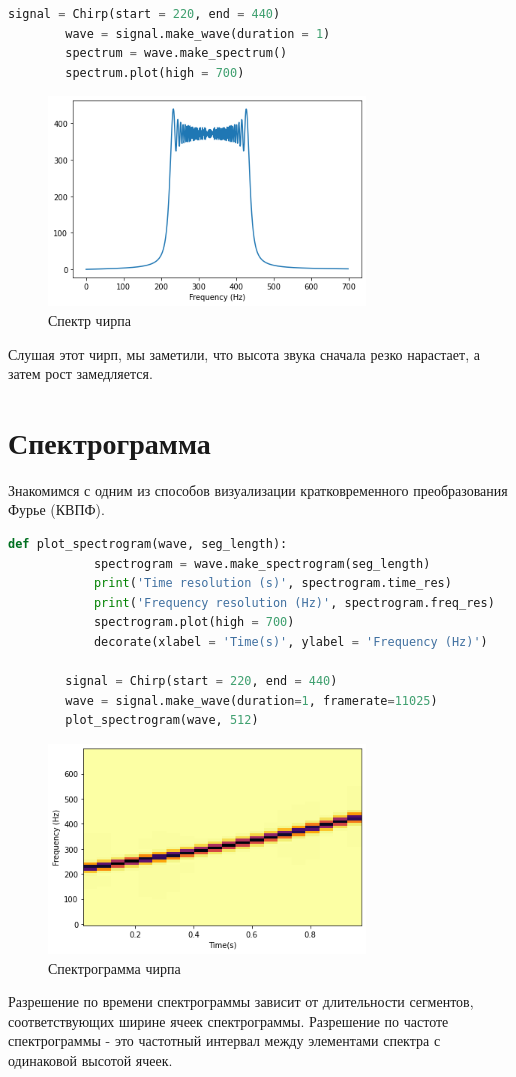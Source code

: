 \documentclass[a4paper, 12pt]{report}
\begin{document}
	\begin{lstlisting}[language=Python,caption=Строим спектр чирпа]
		signal = Chirp(start = 220, end = 440)
		wave = signal.make_wave(duration = 1)
		spectrum = wave.make_spectrum()
		spectrum.plot(high = 700)
	\end{lstlisting}
	\begin{figure}[H]
		\centering
		\includegraphics[width=0.75\textwidth]{chirp3.png}
		\caption{Спектр чирпа}
		\label{fig:chirp3}
	\end{figure}
	Слушая этот чирп, мы заметили, что высота звука сначала резко нарастает, а затем рост замедляется.

	\chapter{Спектрограмма}
	Знакомимся с одним из способов визуализации кратковременного преобразования Фурье (КВПФ).
	\begin{lstlisting}[language=Python,caption=Функция для построения спектрограммы]
		def plot_spectrogram(wave, seg_length):
			spectrogram = wave.make_spectrogram(seg_length)
			print('Time resolution (s)', spectrogram.time_res)
			print('Frequency resolution (Hz)', spectrogram.freq_res)
			spectrogram.plot(high = 700)
			decorate(xlabel = 'Time(s)', ylabel = 'Frequency (Hz)')
		
		signal = Chirp(start = 220, end = 440)
		wave = signal.make_wave(duration=1, framerate=11025)
		plot_spectrogram(wave, 512)
	\end{lstlisting}
	\begin{figure}[H]
		\centering
		\includegraphics[width=0.75\textwidth]{chirp4.png}
		\caption{Спектрограмма чирпа}
		\label{fig:chirp4}
	\end{figure}
	Разрешение по времени спектрограммы зависит от длительности сегментов, соответствующих ширине ячеек спектрограммы.
	Разрешение по частоте спектрограммы - это частотный интервал между элементами спектра с одинаковой высотой ячеек.
\end{document}
